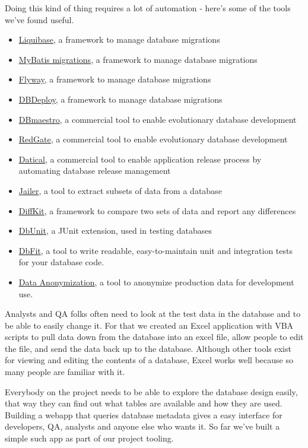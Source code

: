 \documentclass[12pt]{article}
\begin{document}
Doing this kind of thing requires a lot of automation - here's some of
the tools we've found useful.
\begin{itemize}
  \item \href{http://liquibase.org}{Liquibase}, a framework to manage database migrations
  \item \href{https://github.com/mybatis/migrations}{MyBatis migrations}, a framework to manage database migrations
  \item \href{http://flywaydb.org}{Flyway}, a framework to manage database migrations
  \item \href{http://dbdeploy.com}{DBDeploy}, a framework to manage database migrations
  \item \href{http://www.dbmaestro.com}{DBmaestro}, a commercial tool to enable evolutionary database development
  \item \href{http://www.red-gate.com/products/dlm/dlm-automation-suite}{RedGate}, a commercial tool to enable evolutionary database development
  \item \href{http://www.datical.com/}{Datical}, a commercial tool to enable application release process
    by automating database release management
  \item \href{http://jailer.sourceforge.net}{Jailer}, a tool to extract subsets of data from a database
  \item \href{http://www.diffkit.org}{DiffKit}, a framework to compare two sets of data and report any differences
  \item \href{http://dbunit.sourceforge.net}{DbUnit}, a JUnit extension, used in testing databases
  \item \href{http://dbfit.github.io/dbfit/index.html}{DbFit}, a tool to write readable, easy-to-maintain unit and
    integration tests for your database code.
  \item \href{https://github.com/sunitparekh/data-anonymization}{Data Anonymization}, a tool to anonymize production data for development use.
\end{itemize}

Analysts and QA folks often need to look at the test data in the
database and to be able to easily change it. For that we created an
Excel application with VBA scripts to pull data down from the database
into an excel file, allow people to edit the file, and send the data
back up to the database. Although other tools exist for viewing and
editing the contents of a database, Excel works well because so many
people are familiar with it.

Everybody on the project needs to be able to explore the database design
easily, that way they can find out what tables are available and how
they are used. Building a webapp that queries database metadata gives a
easy interface for developers, QA, analysts and anyone else who wants
it. So far we've built a simple such app as part of our project tooling.
\end{document}
